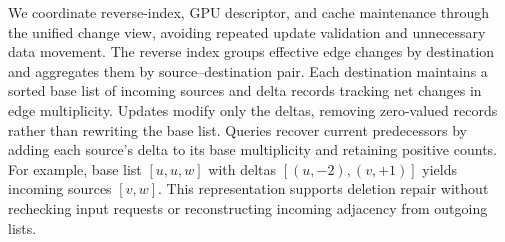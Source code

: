 




We coordinate reverse-index, GPU descriptor, and cache maintenance through the unified change view, avoiding repeated update validation and unnecessary data movement. The reverse index groups effective edge changes by destination and aggregates them by source--destination pair. Each destination maintains a sorted base list of incoming sources and delta records tracking net changes in edge multiplicity. Updates modify only the deltas, removing zero-valued records rather than rewriting the base list. Queries recover current predecessors by adding each source's delta to its base multiplicity and retaining positive counts. For example, base list $[u,u,w]$ with deltas $[(u,-2),(v,+1)]$ yields incoming sources $[v,w]$. This representation supports deletion repair without rechecking input requests or reconstructing incoming adjacency from outgoing lists.

